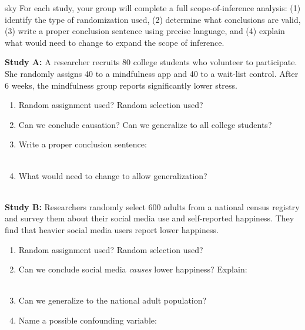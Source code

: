 \documentclass[10pt]{article}
\begin{document}
\namepartnerperiod

\vspace{0.1in}

\begin{scenariobox}[Context]{sky}
\small
For each study, your group will complete a full scope-of-inference analysis:
(1) identify the type of randomization used, (2) determine what conclusions are
valid, (3) write a proper conclusion sentence using precise language, and
(4) explain what would need to change to expand the scope of inference.
\end{scenariobox}

\vspace{0.1in}

\textbf{Study A:} A researcher recruits 80 college students who volunteer to
participate. She randomly assigns 40 to a mindfulness app and 40 to a wait-list
control. After 6 weeks, the mindfulness group reports significantly lower stress.

\begin{practicebox}
\small
\begin{enumerate}[leftmargin=1.5em, itemsep=7pt]
  \item Random assignment used? \blank{3cm} \quad Random selection used? \blank{3cm}
  \item Can we conclude causation? \blank{2cm} \quad Can we generalize to all college
        students? \blank{2cm}
  \item Write a proper conclusion sentence:\\
        \writeline\\[1pt]\writeline
  \item What would need to change to allow generalization?\\
        \writeline\\[1pt]\writeline
\end{enumerate}
\end{practicebox}

\vspace{0.1in}

\textbf{Study B:} Researchers randomly select 600 adults from a national census
registry and survey them about their social media use and self-reported happiness.
They find that heavier social media users report lower happiness.

\begin{practicebox}
\small
\begin{enumerate}[leftmargin=1.5em, itemsep=7pt]
  \item Random assignment used? \blank{3cm} \quad Random selection used? \blank{3cm}
  \item Can we conclude social media \emph{causes} lower happiness? \blank{2cm}
        Explain:\\
        \writeline\\[1pt]\writeline
  \item Can we generalize to the national adult population? \blank{3cm}
  \item Name a possible confounding variable: \blank{9cm}
\end{enumerate}
\end{practicebox}
\end{document}
